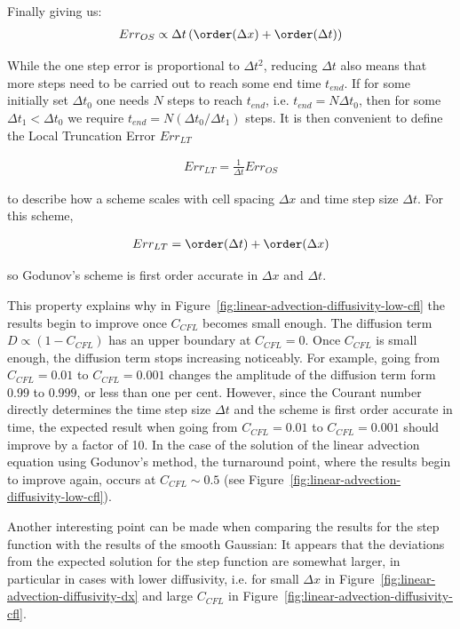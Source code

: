 Finally giving us:
\begin{align}
    Err_{OS} \propto \Delta t \left( \order(\Delta x) + \order(\Delta t) \right)
\label{eq:one-step-error}
\end{align}

While the one step error is proportional to $\Delta t^2$, reducing $\Delta t$ also means that more
steps need to be carried out to reach some end time $t_{end}$. If for some initially set $\Delta
t_0$ one needs $N$ steps to reach $t_{end}$, i.e. $t_{end} = N \Delta t_0$, then for some $\Delta
t_1 < \Delta t_0$ we require $t_{end} = N (\Delta t_0 / \Delta t_1)$ steps. It is then convenient to
define the Local Truncation Error $Err_{LT}$

\begin{align}
    Err_{LT} = \frac{1}{\Delta t} Err_{OS}
\end{align}

to describe how a scheme scales with cell spacing $\Delta x$ and time step size $\Delta t$. For
this scheme,

\begin{align}
    Err_{LT} = \order(\Delta t) + \order(\Delta x) \label{eq:local_truncation_error}
\end{align}

so Godunov's scheme is first order accurate in $\Delta x$ and $\Delta t$.

This property explains why in Figure~\ref{fig:linear-advection-diffusivity-low-cfl} the results
begin to improve once $C_{CFL}$ becomes small enough. The diffusion term $D \propto (1 - C_{CFL})$
has an upper boundary at $C_{CFL} = 0$. Once $C_{CFL}$ is small enough, the diffusion term stops
increasing noticeably. For example, going from $C_{CFL} = 0.01$ to $C_{CFL} = 0.001$ changes the
amplitude of the diffusion term form $0.99$ to $0.999$, or less than one per cent. However, since
the Courant number directly determines the time step size $\Delta t$ and the scheme is first order
accurate in time, the expected result when going from $C_{CFL} = 0.01$ to $C_{CFL} = 0.001$ should
improve by a factor of 10. In the case of the solution of the linear advection equation using
Godunov's method, the turnaround point, where the results begin to improve again, occurs at
$C_{CFL} \sim 0.5$ (see Figure~\ref{fig:linear-advection-diffusivity-low-cfl}).

Another interesting point can be made when comparing the results for the step function with the
results of the smooth Gaussian: It appears that the deviations from the expected solution for the
step function are somewhat larger, in particular in cases with lower diffusivity, i.e. for small
$\Delta x$ in Figure~\ref{fig:linear-advection-diffusivity-dx} and large $C_{CFL}$ in
Figure~\ref{fig:linear-advection-diffusivity-cfl}.

